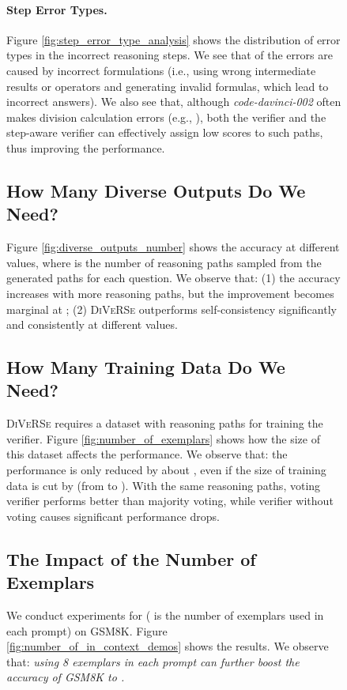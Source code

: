 \documentclass[11pt,a4paper]{article}
\begin{document}
\begin{figure}[t]
\begin{tcolorbox}[colback=blue!5!white,colframe=blue!75!black,title=Chain-Of-Thought Reasoning for GSM8K Math Word Problem,fontupper=\footnotesize,fonttitle=\scriptsize]
\paragraph{Step Error Types.} Figure \ref{fig:step_error_type_analysis} shows the distribution of error types in the incorrect reasoning steps.
We see that  of the errors are caused by incorrect formulations (i.e., using wrong intermediate results or operators and generating invalid formulas, which lead to incorrect answers).
We also see that, although \textit{code-davinci-002} often makes division calculation errors (e.g., ), both the verifier and the step-aware verifier can effectively assign low scores to such paths, thus improving the performance.



\subsection{How Many Diverse Outputs Do We Need?}



Figure \ref{fig:diverse_outputs_number} shows the accuracy at different  values, where  is the number of reasoning paths sampled from the  generated paths for each question.
We observe that:
(1) the accuracy increases with more reasoning paths, but the improvement becomes marginal at ;
(2) \textsc{DiVeRSe} outperforms self-consistency significantly and consistently at different  values.

\subsection{How Many Training Data Do We Need?}

\textsc{DiVeRSe} requires a dataset with reasoning paths for training the verifier.
Figure \ref{fig:number_of_exemplars} shows how the size of this dataset affects the performance.
We observe that:
the performance is only reduced by about , even if the size of training data is cut by  (from  to ).
With the same reasoning paths, voting verifier performs better than majority voting, while verifier without voting causes significant performance drops.

\subsection{The Impact of the Number of Exemplars}
We conduct experiments for  ( is the number of exemplars used in each prompt) on GSM8K.
Figure \ref{fig:number_of_in_context_demos} shows the results.
We observe that: \emph{using 8 exemplars in each prompt can further boost the accuracy of GSM8K to .}




\end{tcolorbox}
\end{figure}
\end{document}

